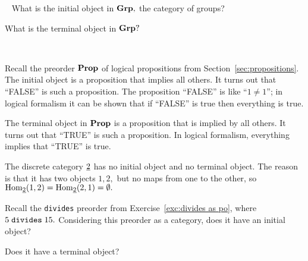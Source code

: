 \documentclass[CT4S-EN-RU]{subfiles}
\begin{document}
\begin{exampleRUS}\label{ex:initial monoid terminal monoid}
\end{exampleRUS}

\begin{exerciseENG}~
\sexc What is the initial object in ${\mathbf{Grp}},$ the category of groups?
\item What is the terminal object in ${\mathbf{Grp}}?$
\endsexc
\end{exerciseENG}

\begin{exerciseRUS}~
\end{exerciseRUS}

\begin{exampleENG}
Recall the preorder ${\mathbf{Prop}}$ of logical propositions from Section~\ref{sec:propositions}. The initial object is a proposition that implies all others. It turns out that “FALSE” is such a proposition. The proposition “FALSE” is like “$1\neq1$”; in logical formalism it can be shown that if “FALSE” is true then everything is true.

The terminal object in ${\mathbf{Prop}}$ is a proposition that is implied by all others. It turns out that “TRUE” is such a proposition. In logical formalism, everything implies that “TRUE” is true.
\end{exampleENG}

\begin{exampleRUS}
\end{exampleRUS}

\begin{exampleENG}
The discrete category $\underline{2}$ has no initial object and no terminal object. The reason is that it has two objects $1,2,$ but no maps from one to the other, so $\textnormal{Hom}_{\underline{2}}(1,2)=\textnormal{Hom}_{\underline{2}}(2,1)=\emptyset.$
\end{exampleENG}

\begin{exampleRUS}
\end{exampleRUS}

\begin{exerciseENG}
Recall the {\tt divides} preorder from Exercise~\ref{exc:divides as po}, where $5\;{\tt divides}\;15.$
\sexc Considering this preorder as a category, does it have an initial object?
\item Does it have a terminal object?
\endsexc
\end{exerciseENG}

\begin{exerciseRUS}
\end{exerciseRUS}
\end{document}
